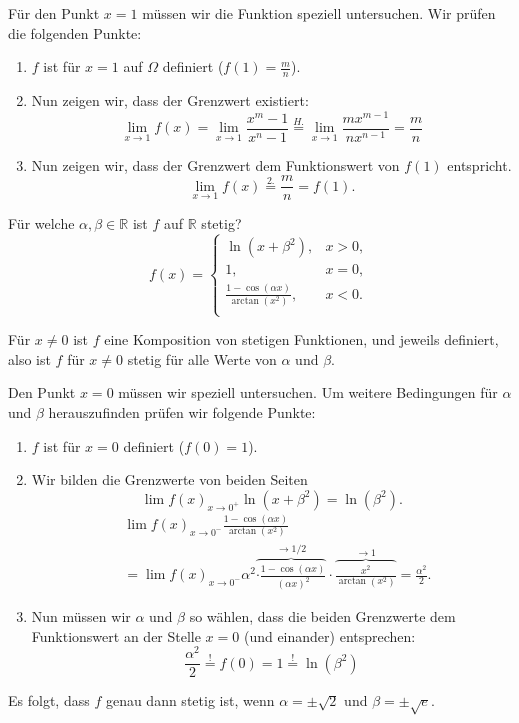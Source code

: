 \documentclass[a4paper,landscape,8pt]{extarticle}
\newcommand{\R}{\mathbb{R}}
\begin{document}
\begin{multicols*}{4}
\begin{warmup}
Für den Punkt $x=1$ müssen wir die Funktion speziell untersuchen. Wir prüfen die
folgenden Punkte: 
\begin{enumerate}
  \item $f$ ist für $x=1$ auf $\Omega$ definiert ($f(1)=\frac{m}{n}$).
  \item Nun zeigen wir, dass der Grenzwert existiert:
  \[
  \lim_{x\to 1} f(x) = \lim_{x\to 1} \frac{x^m-1}{x^n-1} \stackrel{H.}{=}
  \lim_{x\to 1} \frac{m x^{m-1}}{n x^{n-1}} = \frac{m}{n}
  \]
  \item Nun zeigen wir, dass der Grenzwert dem Funktionswert von $f(1)$
  entspricht.
  \[
  \lim_{x\to 1} f(x) \stackrel{2.}{=} \frac{m}{n} = f(1).
  \] 
\end{enumerate}

\Bsp Für welche $\alpha,\beta\in\R$ ist $f$ auf $\R$ stetig?
\[
f(x)=\begin{cases}
\ln(x+\beta^2), & x > 0,\\
1, & x=0,\\
\frac{1-\cos(\alpha x)}{\arctan(x^2)}, & x <0.\\
\end{cases}
\]

Für $x\neq 0 $ ist $f$ eine Komposition von stetigen Funktionen, und jeweils
definiert, also ist $f$ für $x\neq 0$ stetig für alle Werte von $\alpha$ und
$\beta$.

Den Punkt $x=0$ müssen wir speziell untersuchen. Um weitere Bedingungen für
$\alpha$ und $\beta$ herauszufinden prüfen wir folgende Punkte:
\begin{enumerate}
  \item $f$ ist für $x=0$ definiert ($f(0)=1$).
  \item Wir bilden die Grenzwerte von beiden Seiten
  \[
  \lim f(x)_{x\to 0^+} \ln(x+\beta^2) = \ln(\beta^2).
  \]
  \begin{align*}
  &\lim f(x)_{x\to 0^-} \frac{1-\cos(\alpha x)}{\arctan(x^2)}\\
  &= \lim f(x)_{x\to 0^-} \alpha^2 
  \overbrace{\cdot \frac{1-\cos(\alpha x)}{(\alpha x)^2}}^{\to 1/2}
  \cdot \overbrace{\frac{x^2}{\arctan(x^2)}}^{\to 1}= \frac{\alpha^2}{2}.
  \end{align*}
  \item Nun müssen wir $\alpha$ und $\beta$ so wählen, dass die beiden
  Grenzwerte dem Funktionswert an der Stelle $x=0$ (und einander) entsprechen:
  \[
  \frac{\alpha^2}{2} \stackrel{!}{=}
  f(0)=1
  \stackrel{!}{=}
  \ln(\beta^2)
  \]
\end{enumerate}
Es folgt, dass $f$ genau dann stetig ist, wenn $\alpha = \pm\sqrt{2}$ und
$\beta = \pm\sqrt{e}$.


\end{warmup}
\end{multicols*}
\end{document}

